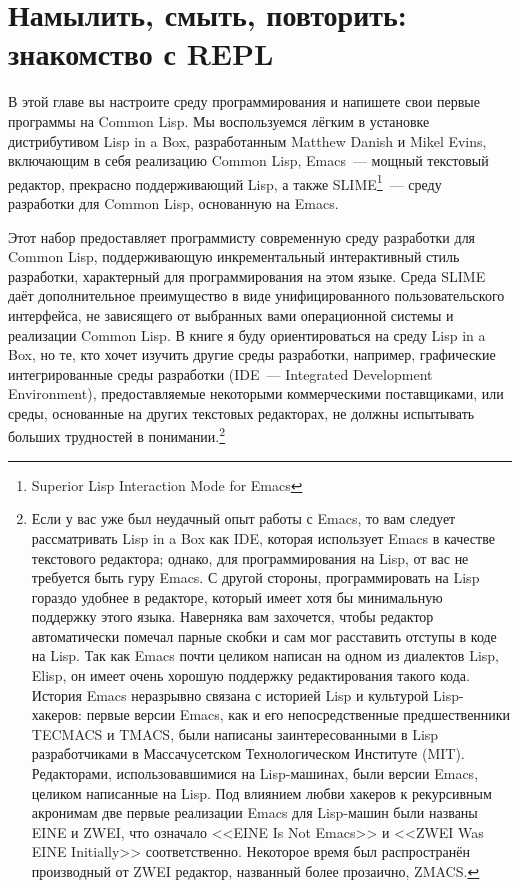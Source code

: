 \chapter{Намылить, смыть, повторить: знакомство с REPL}
\label{ch:02}

В этой главе вы настроите среду программирования и напишете свои первые программы на
Common Lisp. Мы воспользуемся лёгким в установке дистрибутивом Lisp in a Box,
разработанным Matthew Danish и Mikel Evins, включающим в себя реализацию
Common Lisp, Emacs~--- мощный текстовый редактор, прекрасно поддерживающий Lisp, а
также SLIME\footnote{Superior Lisp Interaction Mode for Emacs}~--- среду
разработки для Common Lisp, основанную на Emacs.

Этот набор предоставляет программисту современную среду разработки для Common Lisp,
поддерживающую инкрементальный интерактивный стиль разработки, характерный для
программирования на этом языке. Среда SLIME даёт дополнительное преимущество в виде
унифицированного пользовательского интерфейса, не зависящего от выбранных вами
операционной системы и реализации Common Lisp. В книге я буду ориентироваться на
среду Lisp in a Box, но те, кто хочет изучить другие среды разработки, например,
графические интегрированные среды разработки (IDE~--- Integrated Development Environment),
предоставляемые некоторыми коммерческими поставщиками, или среды, основанные на других
текстовых редакторах, не должны испытывать больших трудностей в понимании.\footnote{Если у
  вас уже был неудачный опыт работы с Emacs, то вам следует рассматривать Lisp in a Box как
  IDE, которая использует Emacs в качестве текстового редактора; однако, для программирования
  на Lisp, от вас не требуется быть гуру Emacs. С другой стороны, программировать на Lisp
  гораздо удобнее в редакторе, который имеет хотя бы минимальную поддержку этого языка.
  Наверняка вам захочется, чтобы редактор автоматически помечал парные скобки и
  сам мог расставить отступы в коде на Lisp. Так как Emacs почти целиком написан на одном
  из диалектов Lisp, Elisp, он имеет очень хорошую поддержку редактирования такого
  кода. История Emacs неразрывно связана с историей Lisp и культурой Lisp-хакеров: первые
  версии Emacs, как и его непосредственные предшественники TECMACS и
  TMACS, были написаны заинтересованными в Lisp разработчиками в Массачусетском
  Технологическом Институте (MIT). Редакторами, использовавшимися на Lisp-машинах, были
  версии Emacs, целиком написанные на Lisp. Под влиянием любви хакеров к рекурсивным
  акронимам две первые реализации Emacs для Lisp-машин были названы EINE и
  ZWEI, что означало <<EINE Is Not Emacs>> и <<ZWEI Was EINE Initially>>
  соответственно. Некоторое время был распространён производный от ZWEI редактор,
  названный более прозаично, ZMACS.}


